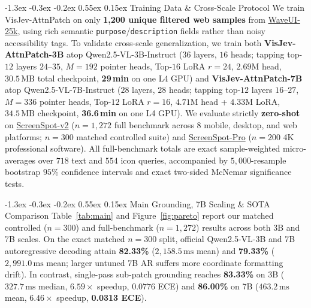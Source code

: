 \documentclass[10pt,twocolumn,letterpaper]{article}
\makeatletter
\renewcommand\subsection{\@startsection{subsection}{2}{\z@}%
  {-1.3ex \@plus -0.3ex \@minus -0.2ex}%
  {0.55ex \@plus 0.15ex}%
  {\normalfont\normalsize\bfseries\color{navy!85!black}}}
\makeatother
\begin{document}
\subsection{Training Data \& Cross-Scale Protocol}
We train VisJev-AttnPatch on only \textbf{1,200 unique filtered web samples} from \href{https://huggingface.co/datasets/Voxel51/WaveUI-25k}{WaveUI-25k}, using rich semantic \texttt{purpose}/\texttt{description} fields rather than noisy accessibility tags. To validate cross-scale generalization, we train both \textbf{VisJev-AttnPatch-3B} atop Qwen2.5-VL-3B-Instruct ($36$ layers, $16$ heads; tapping top-$12$ layers $24\text{--}35$, $M{=}192$ pointer heads, Top-$16$ LoRA $r{=}24$, $2.69\text{M}$ head, $30.5\,\text{MB}$ total checkpoint, \textbf{29\,min} on one L4 GPU) and \textbf{VisJev-AttnPatch-7B} atop Qwen2.5-VL-7B-Instruct ($28$ layers, $28$ heads; tapping top-$12$ layers $16\text{--}27$, $M{=}336$ pointer heads, Top-$12$ LoRA $r{=}16$, $4.71\text{M}$ head + $4.33\text{M}$ LoRA, $34.5\,\text{MB}$ checkpoint, \textbf{36.6\,min} on one L4 GPU). We evaluate strictly \textbf{zero-shot} on \href{https://huggingface.co/datasets/lmms-lab/ScreenSpot-v2}{ScreenSpot-v2} ($n{=}1{,}272$ full benchmark across $8$ mobile, desktop, and web platforms; $n{=}300$ matched controlled suite) and \href{https://huggingface.co/datasets/HongxinLi/ScreenSpot-Pro}{ScreenSpot-Pro} ($n{=}200$ 4K professional software). All full-benchmark totals are exact sample-weighted micro-averages over $718$ text and $554$ icon queries, accompanied by $5{,}000$-resample bootstrap $95\%$ confidence intervals and exact two-sided McNemar significance tests.

\subsection{Main Grounding, 7B Scaling \& SOTA Comparison}
Table~\ref{tab:main} and Figure~\ref{fig:pareto} report our matched controlled ($n{=}300$) and full-benchmark ($n{=}1{,}272$) results across both 3B and 7B scales. On the exact matched $n{=}300$ split, official Qwen2.5-VL-3B and 7B autoregressive decoding attain \textbf{82.33\%} ($2{,}158.5\,\text{ms}$ mean) and \textbf{79.33\%} ($2{,}991.0\,\text{ms}$ mean; larger untuned 7B AR suffers more coordinate formatting drift). In contrast, single-pass sub-patch grounding reaches \textbf{83.33\%} on 3B ($327.7\,\text{ms}$ median, $6.59\times$ speedup, $0.0776$ ECE) and \textbf{86.00\%} on 7B ($463.2\,\text{ms}$ mean, $6.46\times$ speedup, \textbf{0.0313 ECE}).
\end{document}

